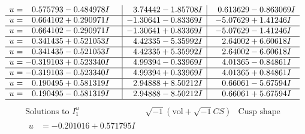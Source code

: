\documentclass[1p]{elsarticle_modified}
\theoremstyle{definition}
\newcommand{\I}{\sqrt{-1}}
\begin{document}
$$\begin{array}{c|c|c}
\begin{aligned}
u &= \phantom{-}0.575793 - 0.484978 I\end{aligned}
 & \phantom{-}3.74442 - 1.85708 I & \phantom{-}0.613629 - 0.863069 I \\ \hline\begin{aligned}
u &= \phantom{-}0.664102 + 0.290971 I\end{aligned}
 & -1.30641 - 0.83369 I & -5.07629 + 1.41246 I \\ \hline\begin{aligned}
u &= \phantom{-}0.664102 - 0.290971 I\end{aligned}
 & -1.30641 + 0.83369 I & -5.07629 - 1.41246 I \\ \hline\begin{aligned}
u &= \phantom{-}0.341435 + 0.521053 I\end{aligned}
 & \phantom{-}4.42335 - 5.35992 I & \phantom{-}2.64002 + 6.60618 I \\ \hline\begin{aligned}
u &= \phantom{-}0.341435 - 0.521053 I\end{aligned}
 & \phantom{-}4.42335 + 5.35992 I & \phantom{-}2.64002 - 6.60618 I \\ \hline\begin{aligned}
u &= -0.319103 + 0.523340 I\end{aligned}
 & \phantom{-}4.99394 - 0.33969 I & \phantom{-}4.01365 - 0.84861 I \\ \hline\begin{aligned}
u &= -0.319103 - 0.523340 I\end{aligned}
 & \phantom{-}4.99394 + 0.33969 I & \phantom{-}4.01365 + 0.84861 I \\ \hline\begin{aligned}
u &= \phantom{-}0.190495 + 0.581319 I\end{aligned}
 & \phantom{-}2.94888 + 8.50212 I & \phantom{-}0.66061 - 5.67594 I \\ \hline\begin{aligned}
u &= \phantom{-}0.190495 - 0.581319 I\end{aligned}
 & \phantom{-}2.94888 - 8.50212 I & \phantom{-}0.66061 + 5.67594 I\\
 \hline 
 \end{array}$$\newpage$$\begin{array}{c|c|c}  
\text{Solutions to }I^u_{1}& \I (\text{vol} + \sqrt{-1}CS) & \text{Cusp shape}\\
 \hline 
\begin{aligned}
u &= -0.201016 + 0.571795 I\end{aligned}

\end{array}$$
\end{document}
